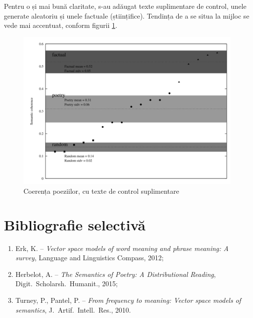 \documentclass[a4paper]{article}
\begin{document}
Pentru o și mai bună claritate, s-au adăugat texte suplimentare de control,
unele generate aleatoriu și unele factuale (științifice). Tendința de a se situa
la mijloc se vede mai accentuat, conform figurii \ref{fig:coe2}.

\begin{figure}[!htb]
  \centering
  \includegraphics[scale=0.2]{img/coherence2.png}
  \caption{Coerența poeziilor, cu texte de control suplimentare}
  \label{fig:coe2}
\end{figure}

\newpage

\section*{Bibliografie selectivă}

\begin{enumerate}[(1)]
\item Erk, K. -- \emph{Vector space models of word meaning and phrase meaning: A survey},
Language and Linguistics Compass, 2012;
\item Herbelot, A. -- \emph{The Semantics of Poetry: A Distributional Reading},
  Digit.\ Scholarsh.\ Humanit., 2015;
\item Turney, P., Pantel, P. -- \emph{From frequency to meaning: Vector space %
  models of semantics}, J.\ Artif.\ Intell.\ Res., 2010.
\end{enumerate}
\end{document}
